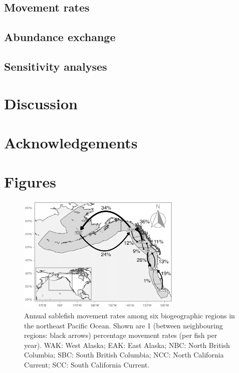 \documentclass{article}
\begin{document}
\subsection{Movement rates}

\subsection{Abundance exchange}

\subsection{Sensitivity analyses}

\section{Discussion}

\section{Acknowledgements}

\section{Figures}

\begin{figure}[htb]
    \centering
    \includegraphics[width = 0.7\textwidth]{map-regions-6-network}
    \caption{Annual sablefish movement rates among six biogeographic regions in the northeast Pacific Ocean. Shown are 1\degree{} (between neighbouring regions: black arrows) percentage movement rates (per fish per year). WAK: West Alaska; EAK: East Alaska; NBC: North British Columbia; SBC: South British Columbia; NCC: North California Current; SCC: South California Current.}
    \label{fig:map-network-regions-6}
\end{figure}
\end{document}

